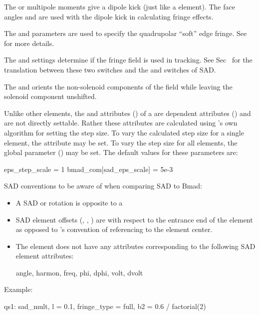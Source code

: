 {The  or  multipole moments give a dipole kick (just like a  element). The
face angles  and  are used with the dipole kick in calculating fringe effects.

The  and  parameters are used to specify the quadrupolar ``soft'' edge fringe. See
 for more details.

The  and  settings determine if the fringe field is used in
tracking. See Sec~ for the translation between these two switches and the 
and  switches of SAD.

The  and  orients the non-solenoid components of the field while
leaving the solenoid component unshifted.

Unlike other elements, the  and  attributes () of a
 are dependent attributes () and are not directly settable. Rather these
attributes are calculated using 's own algorithm for setting the step size. To vary the
calculated step size for a single  element, the attribute  may be
set.  To vary the step size for all  elements, the global parameter
 () may be set.  The default values for these
parameters are:
\begin{example}
  eps_step_scale          = 1
  bmad_com[sad_eps_scale] = 5e-3
\end{example}

SAD conventions to be aware of when comparing SAD to Bmad:
\begin{itemize}
\item
A SAD  or  rotation is opposite to a \bmad {}
\item
SAD element offsets (, , ) are with respect to the entrance end of the element
as opposed to \bmad's convention of referencing to the element center.
\item
  The \bmad {} element does not have any attributes corresponding to the following
SAD  element attributes:
\vspace{0.5ex}
\begin{example}
  angle, harmon, freq, phi, dphi, volt, dvolt
\end{example}
\end{itemize}

Example:
\begin{example}
  qs1: sad_mult, l = 0.1, fringe_type = full, b2 = 0.6 / factorial(2)
\end{example}

}
